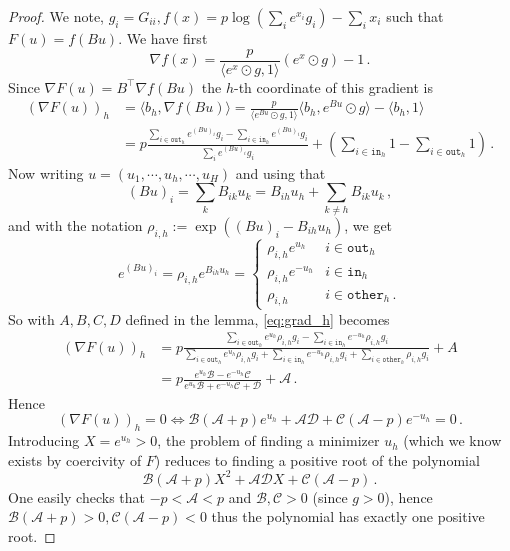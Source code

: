 \documentclass[10pt,a4paper]{amsart}
\newcommand{\Ah}{\mathcal{A}}
\newcommand{\Bh}{\mathcal{B}}
\newcommand{\Ch}{\mathcal{C}}
\newcommand{\Dh}{\mathcal{D}}
\begin{document}
\begin{proof}
We note, $g_i = G_{ii}, f(x) = p\log(\sum_i e^{x_i} g_i) - \sum_i x_i$ such that $F(u) = f(Bu)$. We have first
\begin{equation}
\nabla f(x) = \frac{p}{\langle e^{x} \odot g, 1\rangle}(e^{x} \odot g) - 1\,.
\end{equation}
Since $\nabla F(u) = B^\top \nabla f(Bu)$ the $h$-th coordinate of this gradient is
\begin{equation}
\label{eq:grad_h}
\begin{split}
(\nabla F(u))_h &= \langle b_h, \nabla f(Bu) \rangle =  \frac{p}{\langle e^{Bu} \odot g, 1\rangle} 
\langle b_h, e^{Bu} \odot g \rangle -  \langle b_h, 1\rangle\\
&= p\frac{\sum_{i \in \texttt{out}_h} e^{(Bu)_i}g_i- \sum_{i \in \texttt{in}_h} e^{(Bu)_i}g_i}{\sum_{i} e^{(Bu)_i}g_i} + 
(\sum_{i\in \texttt{in}_h} 1 - \sum_{i\in \texttt{out}_h} 1)\,.
\end{split}
\end{equation}
Now writing $u = (u_1, \cdots, u_h, \cdots, u_H)$ and using that
\begin{equation}
(Bu)_i = \sum_{k} B_{ik}u_k = B_{ih}u_h + \sum_{k \neq h} B_{ik} u_k
\,,
\end{equation}
and with the notation $\rho_{i,h} := \exp((Bu)_i- 
B_{ih} u_{h}
)$, we get
\begin{equation}
e^{(Bu)_i} =
\rho_{i,h} e^{
B_{ih}u_{h}
} = 
 \begin{cases}
\rho_{i,h} e^{u_h} & i \in \texttt{out}_h \\
\rho_{i,h}  e^{-u_h}& i \in \texttt{in}_h \\
\rho_{i,h} & i \in \texttt{other}_h\,.
\end{cases}
\end{equation}
So with $A, B,C,D$ defined in the lemma, \eqref{eq:grad_h} becomes
\begin{equation}
\begin{split}
(\nabla F(u))_h &= p\frac{\sum_{i \in \texttt{out}_h} e^{u_h} \rho_{i,h} g_i
- \sum_{i \in \texttt{in}_h} e^{-u_h} \rho_{i,h}g_i}{\sum_{i \in \texttt{out}_h} e^{u_h}\rho_{i,h} g_i 
+ \sum_{i \in \texttt{in}_h} e^{-u_h} \rho_{i,h} g_i + \sum_{i \in \texttt{other}_h} \rho_{i,h} g_i} + A \\
&= p\frac{e^{u_h} \Bh - e^{-u_h} \Ch}{e^{u_h} \Bh + e^{-u_h}\Ch + \Dh} + \Ah\,.
\end{split}
\end{equation}
Hence
\begin{equation}
(\nabla F(u))_h = 0 \iff \Bh(\Ah + p) e^{u_h}+ \Ah \Dh + \Ch(\Ah - p)e^{-u_h} = 0\,.
\end{equation}
Introducing $X = e^{u_h}>0$, the problem of finding a minimizer $u_{h}$ (which we know exists by coercivity of $F$) reduces to finding a positive root of the polynomial
\begin{equation}
\Bh(\Ah + p) X^2 + \Ah \Dh X + \Ch(\Ah-p)\,.
\end{equation}
One easily checks that $-p <\Ah < p$ and $\Bh, \Ch  >0$ (since $g > 0$), hence $\Bh( \Ah +  p) > 0,  \Ch( \Ah-p) < 0$ thus the polynomial has exactly one positive root.
\end{proof}
\end{document}
